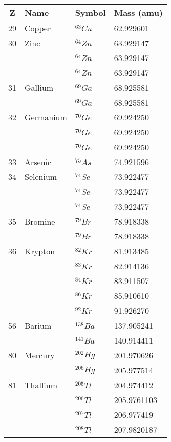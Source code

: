 \begin{margintable}[20pt]
  \footnotesize%
  \begin{center}
    \begin{tabular}{clll}
      \toprule
     Z & Name & Symbol & Mass (amu) \\
      \midrule
      29   & Copper & ${}^{63}Cu$ & 62.929601 \\
      30   & Zinc & ${}^{64}Zn$ & 63.929147 \\
      & & ${}^{64}Zn$ & 63.929147 \\
      & & ${}^{64}Zn$ & 63.929147 \\
      31   & Gallium & ${}^{69}Ga$ & 68.925581 \\
      & & ${}^{69}Ga$ & 68.925581 \\
      32   & Germanium & ${}^{70}Ge$ & 69.924250 \\
      & & ${}^{70}Ge$ & 69.924250 \\
      & & ${}^{70}Ge$ & 69.924250 \\
      33   & Arsenic & ${}^{75}As$ & 74.921596 \\
      34   & Selenium & ${}^{74}Se$ & 73.922477 \\
      & & ${}^{74}Se$ & 73.922477 \\
      & & ${}^{74}Se$ & 73.922477 \\
      35   & Bromine & ${}^{79}Br$ & 78.918338 \\
       & & ${}^{79}Br$ & 78.918338 \\
      36   & Krypton & ${}^{82}Kr$ & 81.913485 \\
      & & ${}^{83}Kr$ & 82.914136 \\
      & & ${}^{84}Kr$ & 83.911507 \\
      & & ${}^{86}Kr$ & 85.910610 \\
      & & ${}^{92}Kr$ & 91.926270 \\
      56   & Barium & ${}^{138}Ba$ & 137.905241 \\
      & & ${}^{141}Ba$ & 140.914411 \\
      80   & Mercury & ${}^{202}Hg$ & 201.970626 \\
      & & ${}^{206}Hg$ & 205.977514 \\
      81   & Thallium & ${}^{205}Tl$ & 204.974412 \\
      & & ${}^{206}Tl$ & 205.9761103 \\
      & & ${}^{207}Tl$ & 206.977419 \\
      & & ${}^{208}Tl$ & 207.9820187 \\

\end{tabular}
\end{center}
\end{margintable}
